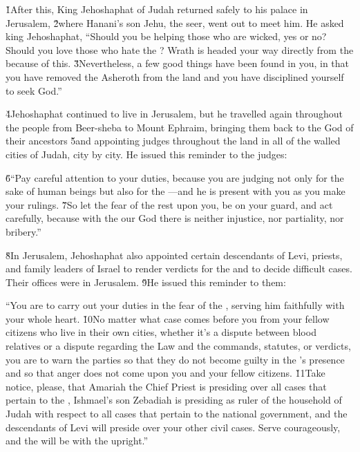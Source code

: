 \v{1}After this, King Jehoshaphat of Judah returned safely to his palace in Jerusalem, \v{2}where Hanani's son Jehu, the seer, went out to meet him. He asked king Jehoshaphat, ``Should you be helping those who are wicked, yes or no? Should you love those who hate the ? Wrath is headed your way directly from the  because of this. \v{3}Nevertheless, a few good things have been found in you, in that you have removed the Asheroth from the land and you have disciplined yourself to seek God.''

\v{4}Jehoshaphat continued to live in Jerusalem, but he travelled again throughout the people from Beer-sheba to Mount Ephraim, bringing them back to the  God of their ancestors \v{5}and appointing judges throughout the land in all of the walled cities of Judah, city by city. He issued this reminder to the judges:

\begin{poetry}
\poeml \v{6}``Pay careful attention to your duties, because you are judging not only for the sake of human beings but also for the ---and he is present with you as you make your rulings. \v{7}So let the fear of the  rest upon you, be on your guard, and act carefully, because with the  our God there is neither injustice, nor partiality, nor bribery.''
\end{poetry}

\v{8}In Jerusalem, Jehoshaphat also appointed certain descendants of Levi, priests, and family leaders of Israel to render verdicts for the  and to decide difficult cases. Their offices were in Jerusalem. \v{9}He issued this reminder to them:

\begin{poetry}
\poeml ``You are to carry out your duties in the fear of the , serving him faithfully with your whole heart. \v{10}No matter what case comes before you from your fellow citizens who live in their own cities, whether it's a dispute between blood relatives or a dispute regarding the Law and the commands, statutes, or verdicts, you are to warn the parties so that they do not become guilty in the 's presence and so that anger does not come upon you and your fellow citizens. \v{11}Take notice, please, that Amariah the Chief Priest is presiding over all cases that pertain to the , Ishmael's son Zebadiah is presiding as ruler of the household of Judah with respect to all cases that pertain to the national government, and the descendants of Levi will preside over your other civil cases. Serve courageously, and the  will be with the upright.''
\end{poetry}

